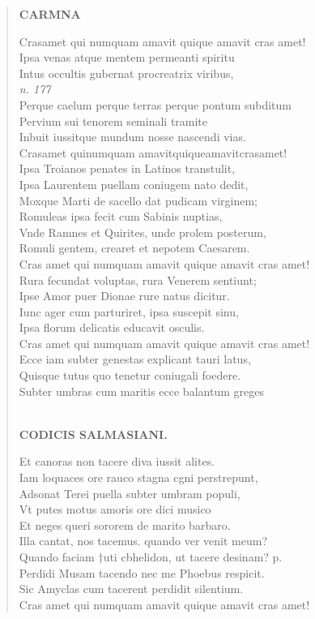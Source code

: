 \documentclass[11pt, a4paper]{report}
\begin{document}
\begin{verse}
    \begin{center} \textbf{CARMNA} \end{center}Crasamet qui numquam amavit quique amavit cras amet! \\ Ipsa venas atque mentem permeanti spiritu \\ Intus occultis gubernat procreatrix viribus, \\ \textit{n. 177} \\ Perque caelum perque terras perque pontum subditum \\ Pervium sui tenorem seminali tramite \\ Inbuit iussitque mundum nosse nascendi vias. \\ Crasamet quinumquam amavitquiqueamavitcrasamet! \\ Ipsa Troianos penates in Latinos transtulit, \\ Ipsa Laurentem puellam coniugem nato dedit, \\ Moxque Marti de sacello dat pudicam virginem; \\ Romuleas ipsa fecit cum Sabinis nuptias, \\ Vnde Ramnes et Quirites, unde prolem posterum, \\ Romuli gentem, crearet et nepotem Caesarem. \\ Cras amet qui numquam amavit quique amavit cras amet! \\ Rura fecundat voluptas, rura Venerem sentiunt; \\ Ipse Amor puer Dionae rure natus dicitur. \\ Iunc ager cum parturiret, ipsa suscepit sinu, \\ Ipsa florum delicatis educavit osculis. \\ Cras amet qui numquam amavit quique amavit cras amet! \\ Ecce iam subter genestas explicant tauri latus, \\ Quisque tutus quo tenetur coniugali foedere. \\ Subter umbras cum maritis ecce balantum greges \\ 
        ﻿\pagebreak 
    \begin{center} \textbf{CODICIS SALMASIANI.} \end{center} \marginpar{[175]} Et canoras non tacere diva iussit alites. \\ Iam loquaces ore rauco stagna cgni perstrepunt, \\ Adsonat Terei puella subter umbram populi, \\ Vt putes motus amoris ore dici musico \\ Et neges queri sororem de marito barbaro. \\ Illa cantat, nos tacemus. quando ver venit meum? \\ Quando faciam †uti cbhelidon, ut tacere desinam? p. \\ Perdidi Musam tacendo nec me Phoebus respicit. \\ Sic Amyclas cum tacerent perdidit silentium. \\ Cras amet qui numquam amavit quique amavit cras amet! \\ 
      \end{verse}
  
\end{document}

